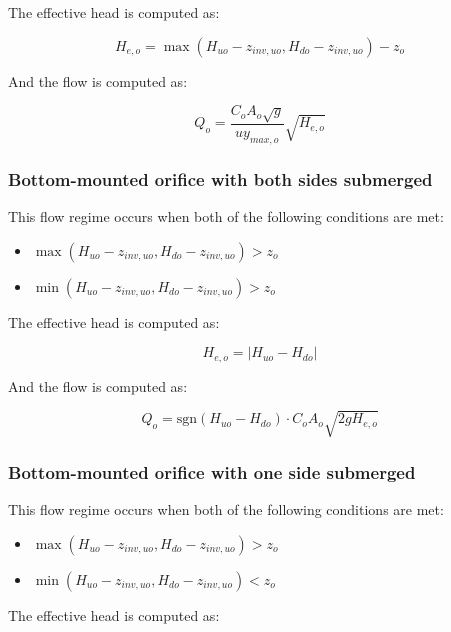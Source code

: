 \documentclass[11pt]{article}
\begin{document}
The effective head is computed as:

\begin{equation}
  H_{e,o} = \max(H_{uo} - z_{inv,uo}, H_{do} - z_{inv,uo}) - z_{o}
\end{equation}

And the flow is computed as:

\begin{equation}
 Q_o = \frac{C_o A_o \sqrt{g}}{u y_{max,o}} \sqrt{H_{e,o}}
\end{equation}

\subsubsection*{Bottom-mounted orifice with both sides submerged}

This flow regime occurs when both of the following conditions are met:

\begin{itemize}
\item $\max(H_{uo} - z_{inv,uo}, H_{do} - z_{inv,uo}) > z_o$
\item $\min(H_{uo} - z_{inv,uo}, H_{do} - z_{inv,uo}) > z_o$
\end{itemize}

The effective head is computed as:

\begin{equation}
  H_{e,o} = | H_{uo} - H_{do} |
\end{equation}

And the flow is computed as:

\begin{equation}
 Q_o = \text{sgn}(H_{uo} - H_{do}) \cdot C_o A_o \sqrt{2 g H_{e,o}} 
\end{equation}

\subsubsection*{Bottom-mounted orifice with one side submerged}

This flow regime occurs when both of the following conditions are met:

\begin{itemize}
\item $\max(H_{uo} - z_{inv,uo}, H_{do} - z_{inv,uo}) > z_o$
\item $\min(H_{uo} - z_{inv,uo}, H_{do} - z_{inv,uo}) < z_o$
\end{itemize}

The effective head is computed as:
\end{document}
